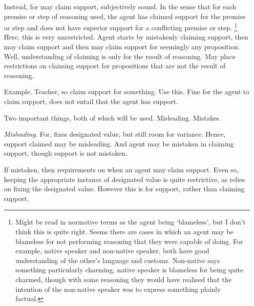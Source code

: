 \begin{note}[Support]
  Instead, for {may} claim support, subjectively sound.
  In the sense that for each premise or step of reasoning used, the agent has claimed support for the premise or step and does not have superior support for a conflicting premise or step.\nolinebreak
  \footnote{
    Might be read in normative terms as the agent being `blameless', but I don't think this is quite right.
    Seems there are cases in which an agent may be blameless for not performing reasoning that they were capable of doing.
    For example, native speaker and non-native speaker, both have good understanding of the other's language and customs.
    Non-native says something particularly charming, native speaker is blameless for being quite charmed, though with some reasoning they would have realised that the intention of the non-native speaker was to express something plainly factual.
  }
  Here, this is very unrestricted.
  Agent starts by mistakenly claiming support, then may claim support and then may claim support for seemingly any proposition.
  Well, understanding of claiming is only for the result of reasoning.
  May place restrictions on claiming support for propositions that are not the result of reasoning.

  Example.
  Teacher, so claim support for something.
  Use this.
  Fine for the agent to claim support, does not entail that the agent has support.

  Two important things, both of which will be used.
  Misleading.
  Mistakes.
\end{note}


\begin{note}[Misleading]
  \emph{Misleading}.
  For, fixes designated value, but still room for variance.
  Hence, support claimed may be misleading.
  And agent may be mistaken in claiming support, though support is not mistaken.

  If mistaken, then requirements on when an agent may claim support.
  Even so, keeping the appropriate instance of designated value is quite restrictive, as relies on fixing the designated value.
  However this is for support, rather than claiming support.
\end{note}



